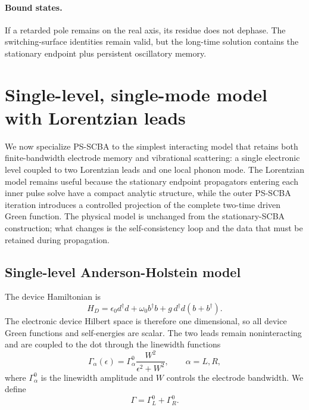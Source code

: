 \documentclass[
 reprint,
 superscriptaddress,
 amsmath,amssymb,
 aps,prb,
 longbibliography,
 floatfix
]{revtex4-2}
\begin{document}
\paragraph{Bound states.}
If a retarded pole remains on the real axis, its residue does not dephase. The switching-surface identities remain valid, but the long-time solution contains the stationary endpoint plus persistent oscillatory memory.



\section{Single-level, single-mode model with Lorentzian leads}
\label{sec:numerics}

We now specialize PS-SCBA to the simplest interacting model that retains both finite-bandwidth electrode memory and vibrational scattering: a single electronic level coupled to two Lorentzian leads and one local phonon mode. The Lorentzian model remains useful because the stationary endpoint propagators entering each inner pulse solve have a compact analytic structure, while the outer PS-SCBA iteration introduces a controlled projection of the complete two-time driven Green function. The physical model is unchanged from the stationary-SCBA construction; what changes is the self-consistency loop and the data that must be retained during propagation.



\subsection{Single-level Anderson-Holstein model}
\label{sec:dot-model}

The device Hamiltonian is
\begin{equation}
H_D
=
\epsilon_0 d^\dagger d
+
\omega_0 b^\dagger b
+
g\,d^\dagger d
\left(
b+b^\dagger
\right).
\label{eq:holstein-dot}
\end{equation}
The electronic device Hilbert space is therefore one dimensional, so all device Green functions and self-energies are scalar. The two leads remain noninteracting and are coupled to the dot through the linewidth
functions
\begin{equation}
\Gamma_\alpha(\epsilon)
=
\Gamma_\alpha^0
\frac{W^2}{\epsilon^2+W^2},
\qquad
\alpha=L,R,
\label{eq:lorentzian}
\end{equation}
where $\Gamma_\alpha^0$ is the linewidth amplitude and $W$ controls the electrode bandwidth. We define
\begin{equation*}
\Gamma
=
\Gamma_L^0+\Gamma_R^0 .
\end{equation*}
\end{document}
